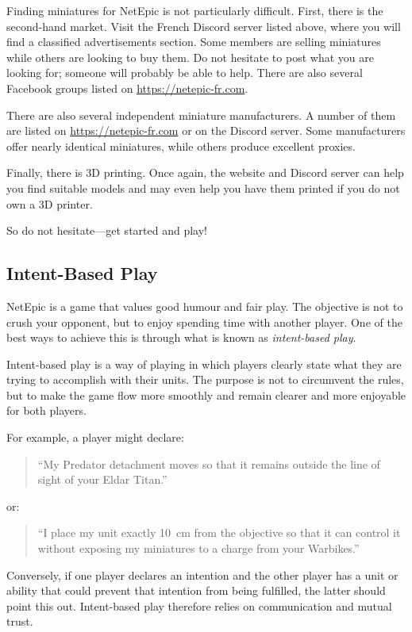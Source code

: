 Finding miniatures for NetEpic is not particularly difficult. First, there is the second-hand market. Visit the French Discord server listed above, where you will find a classified advertisements section. Some members are selling miniatures while others are looking to buy them. Do not hesitate to post what you are looking for; someone will probably be able to help. There are also several Facebook groups listed on \url{https://netepic-fr.com}.

There are also several independent miniature manufacturers.
A number of them are listed on \url{https://netepic-fr.com} or on the Discord server.
Some manufacturers offer nearly identical miniatures, while others produce excellent proxies.

Finally, there is 3D printing. Once again, the website and Discord server can help you find suitable models and may even help you have them printed if you do not own a 3D printer.

So do not hesitate---get started and play!

\subsection{Intent-Based Play}

NetEpic is a game that values good humour and fair play. The objective is not to crush your opponent, but to enjoy spending time with another player. One of the best ways to achieve this is through what is known as \textit{intent-based play}.

Intent-based play is a way of playing in which players clearly state what they are trying to accomplish with their units. The purpose is not to circumvent the rules, but to make the game flow more smoothly and remain clearer and more enjoyable for both players.

For example, a player might declare:

\begin{quote}
    ``My Predator detachment moves so that it remains outside the line of sight of your Eldar Titan.''
\end{quote}

or:

\begin{quote}
    ``I place my unit exactly 10~cm from the objective so that it can control it without exposing my miniatures to a charge from your Warbikes.''
\end{quote}

Conversely, if one player declares an intention and the other player has a unit or ability that could prevent that intention from being fulfilled, the latter should point this out. Intent-based play therefore relies on communication and mutual trust.

